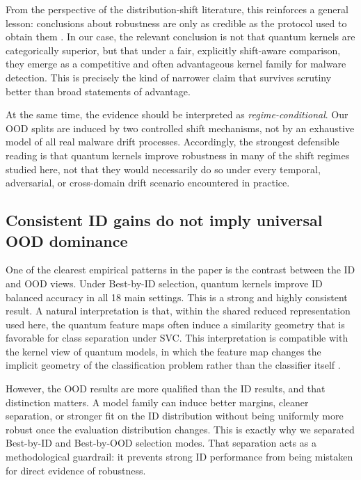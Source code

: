\documentclass[pdflatex,sn-mathphys-num]{sn-jnl}%
\theoremstyle{thmstyleone}%
\theoremstyle{thmstyletwo}%
\theoremstyle{thmstylethree}%
\begin{document}
From the perspective of the distribution-shift literature, this reinforces a general lesson: conclusions about robustness are only as credible as the protocol used to obtain them \cite{quinonero-candela2008datasetshift,gulrajani2021domainbed,koh2021wilds,yao2022wildtime}. In our case, the relevant conclusion is not that quantum kernels are categorically superior, but that under a fair, explicitly shift-aware comparison, they emerge as a competitive and often advantageous kernel family for malware detection. This is precisely the kind of narrower claim that survives scrutiny better than broad statements of advantage.

At the same time, the evidence should be interpreted as \emph{regime-conditional}. Our OOD splits are induced by two controlled shift mechanisms, not by an exhaustive model of all real malware drift processes. Accordingly, the strongest defensible reading is that quantum kernels improve robustness in many of the shift regimes studied here, not that they would necessarily do so under every temporal, adversarial, or cross-domain drift scenario encountered in practice.

\subsection{Consistent ID gains do not imply universal OOD dominance}

One of the clearest empirical patterns in the paper is the contrast between the ID and OOD views. Under Best-by-ID selection, quantum kernels improve ID balanced accuracy in all 18 main settings. This is a strong and highly consistent result. A natural interpretation is that, within the shared reduced representation used here, the quantum feature maps often induce a similarity geometry that is favorable for class separation under SVC. This interpretation is compatible with the kernel view of quantum models, in which the feature map changes the implicit geometry of the classification problem rather than the classifier itself \cite{havlicek2019quantumenhanced,schuld2019featurehilbert,schuld2021kernelmethods}.

However, the OOD results are more qualified than the ID results, and that distinction matters. A model family can induce better margins, cleaner separation, or stronger fit on the ID distribution without being uniformly more robust once the evaluation distribution changes. This is exactly why we separated Best-by-ID and Best-by-OOD selection modes. That separation acts as a methodological guardrail: it prevents strong ID performance from being mistaken for direct evidence of robustness.
\end{document}
